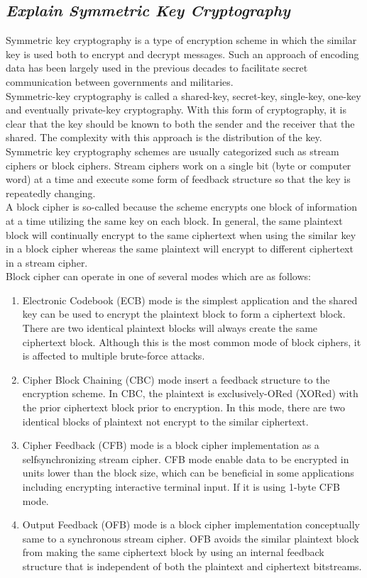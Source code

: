 \documentclass{article}
\begin{document}
\subsection{\textbf{\textit{Explain Symmetric Key Cryptography}}}
Symmetric key cryptography is a type of encryption scheme in which the similar key is used both to encrypt and decrypt messages. Such an approach of encoding data has been largely used in the previous decades to facilitate secret communication between governments and militaries.\\
Symmetric-key cryptography is called a shared-key, secret-key, single-key, one-key and eventually private-key cryptography. With this form of cryptography, it is clear that the key should be known to both the sender and the receiver that the shared. The complexity with this approach is the distribution of the key.\\
Symmetric key cryptography schemes are usually categorized such as stream ciphers or block ciphers. Stream ciphers work on a single bit (byte or computer word) at a time and execute some form of feedback structure so that the key is repeatedly changing.\\
A block cipher is so-called because the scheme encrypts one block of information at a time utilizing the same key on each block. In general, the same plaintext block will continually encrypt to the same ciphertext when using the similar key in a block cipher whereas the same plaintext will encrypt to different ciphertext in a stream cipher.\\

Block cipher can operate in one of several modes which are as follows:
\begin{enumerate}
	\item Electronic Codebook (ECB) mode is the simplest application and the shared key can be used to encrypt the plaintext block to form a ciphertext block. There are two identical plaintext blocks will always create the same ciphertext block. Although this is the most common mode of block ciphers, it is affected to multiple brute-force attacks.
	\item Cipher Block Chaining (CBC) mode insert a feedback structure to the encryption scheme. In CBC, the plaintext is exclusively-ORed (XORed) with the prior ciphertext block prior to encryption. In this mode, there are two identical blocks of plaintext not encrypt to the similar ciphertext.
	\item Cipher Feedback (CFB) mode is a block cipher implementation as a selfsynchronizing stream cipher. CFB mode enable data to be encrypted in units lower than the block size, which can be beneficial in some applications including encrypting interactive terminal input. If it is using 1-byte CFB mode.
	\item Output Feedback (OFB) mode is a block cipher implementation conceptually same to a synchronous stream cipher. OFB avoids the similar plaintext block from making the same ciphertext block by using an internal feedback structure that is independent of both the plaintext and ciphertext bitstreams.
\end{enumerate}
\end{document}
